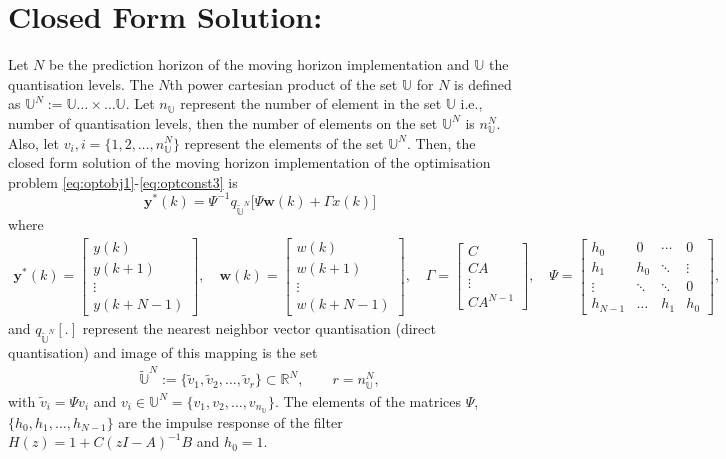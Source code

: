 \documentclass[a4paper]{article}
\begin{document}
\section{Closed Form Solution:}
Let $N$ be the prediction horizon of the moving horizon implementation and $\mathbb{U}$ the quantisation levels. The $N$th power cartesian product of the set $\mathbb{U}$ for $N$ is defined as  $\mathbb{U}^{N}:= \mathbb{U} \ldots \times \ldots \mathbb{U}$. Let $n_{\mathbb{U}}$ represent the number of element in the set $\mathbb{U}$ i.e., number of quantisation levels, then the number of elements on the set $\mathbb{U}^{N}$ is $n_{\mathbb{U}}^{N}$. Also, let $v_{i}, i = \{1, 2, \ldots, n_{\mathbb{U}}^{N}\}$ represent the elements of the set $\mathbb{U}^{N}$. Then, the closed form solution of the moving horizon implementation of the optimisation problem \eqref{eq:optobj1}-\eqref{eq:optconst3} is 
\begin{equation}
	\mathbf{y}^{\ast}(k) = \Psi^{-1} q_{\tilde{\mathbb{U}}^{N}} \big[\Psi \mathbf{w}(k) + \Gamma x(k)\big]
\end{equation}
where 
\begin{align*}
\mathbf{y}^{\ast}(k) = \begin{bmatrix}
	y(k) \\ y(k+1) \\ \vdots \\ y(k+N-1)
\end{bmatrix},
\quad
\mathbf{w}(k) = \begin{bmatrix}
	w(k) \\ w(k+1) \\ \vdots \\ w(k+N-1)
\end{bmatrix},
\quad
\Gamma = \begin{bmatrix}
	C \\ CA \\ \vdots \\ CA^{N-1}
\end{bmatrix},
\quad
\Psi = \begin{bmatrix}
	h_{0} & 0 & \cdots & 0 \\
	h_{1} & h_{0} & \ddots & \vdots \\
	\vdots & \ddots & \ddots & 0 \\
	h_{N-1} & \ldots & h_{1} & h_{0}
\end{bmatrix},
\end{align*}
and $q_{\tilde{\mathbb{U}}^{N}}[.]$ represent the nearest neighbor vector quantisation (direct quantisation) and image of this mapping is the set 
\begin{eqnarray*}
	\tilde{\mathbb{U}}^{N} := \{\tilde{v}_{1}, \tilde{v}_{2}, \ldots, \tilde{v}_{r}\} \subset \mathbb{R}^{N}, \qquad r = n_{\mathbb{U}}^{N},
\end{eqnarray*}
with $\tilde{v}_{i} = \Psi v_{i}$ and $v_{i} \in \mathbb{U}^{N} = \{ v_{1}, v_{2}, \ldots, v_{n_{\mathbb{U}}}\}$. The elements of the matrices $\Psi$, $\{h_{0}, h_{1}, \ldots, h_{N-1}\}$ are the impulse response of the filter $H(z) = 1 + C(zI-A)^{-1}B$ and  $h_{0}=1$.
\end{document}
